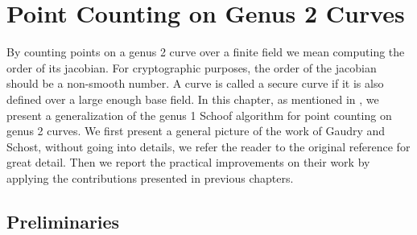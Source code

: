 
\chapter{Point Counting on Genus 2 Curves}

By counting points on a genus 2 curve over a finite field we mean computing the order of its 
jacobian. For cryptographic purposes, the order of the jacobian should be a non-smooth number. A 
curve is called a secure curve if it is also defined over a large enough base field. In this 
chapter, as mentioned in , we present a generalization of the genus 1 
Schoof algorithm for point counting on genus 2 curves. We first present a general picture of the 
work of Gaudry and Schost, without going into details, we refer the reader to the original reference 
\cite{GASC2010} for great detail. Then we report the practical improvements on their work by 
applying the contributions presented in previous chapters.









\section{Preliminaries}
\label{section:genus2-pre}

